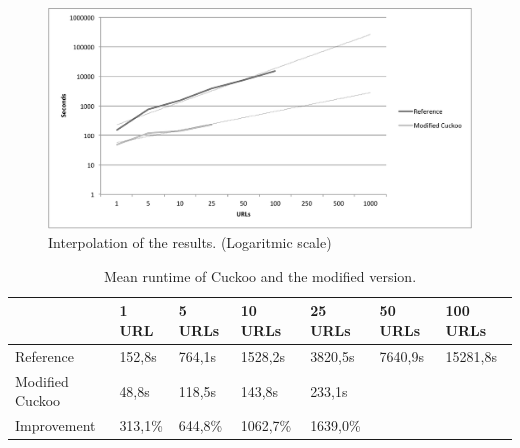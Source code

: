 \begin{figure}[h]
    \centering
    \centerline{\includegraphics[width=20cm]{Images/chart-trend}}
    \caption{Interpolation of the results. (Logaritmic scale)}
    \label{fig:chart-trend}
\end{figure}

\begin{table}[h]
\caption{Mean runtime of Cuckoo and the modified version.}
\label{tbl:results}
\begin{tabular}{@{}lllllll@{}}
\toprule
                & 1 URL    & 5 URLs   & 10 URLs      & 25 URLs      & 50 URLs     & 100 URLs \\ \midrule
Reference       & 152,8s   & 764,1s   & 1528,2s      & 3820,5s      & 7640,9s     & 15281,8s \\
Modified Cuckoo & 48,8s    & 118,5s   & 143,8s       & 233,1s       &             &          \\
Improvement     & 313,1\%  & 644,8\%  & 1062,7\%     & 1639,0\%     &             &          \\ \bottomrule
\end{tabular}
\end{table}
